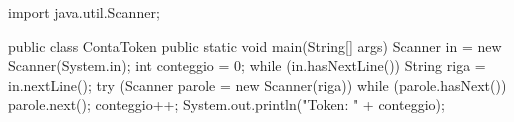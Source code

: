 \begin{unipdcode}[language=Java]
import java.util.Scanner;

public class ContaToken {
    public static void main(String[] args) {
        Scanner in = new Scanner(System.in);
        int conteggio = 0;
        while (in.hasNextLine()) {
            String riga = in.nextLine();
            try (Scanner parole = new Scanner(riga)) {
                while (parole.hasNext()) {
                    parole.next();
                    conteggio++;
                }
            }
        }
        System.out.println("Token: " + conteggio);
    }
}
\end{unipdcode}

